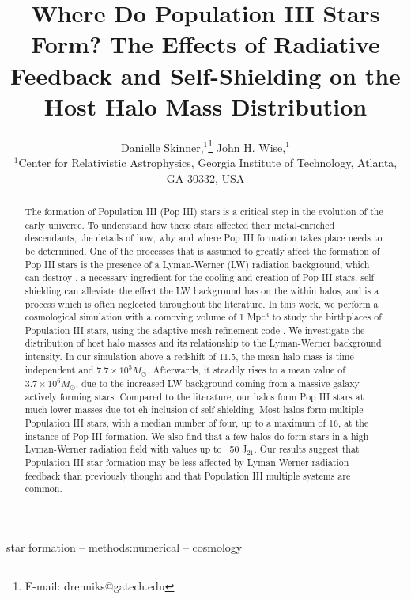 \documentclass[a4paper,fleqn,usenatbib]{mnras}
\title[Where Do Pop III Stars Form?]{Where Do Population III Stars Form? The Effects of Radiative Feedback and Self-Shielding on the Host Halo Mass Distribution}
\author[Danielle Skinner et al.]{
Danielle Skinner,$^{1}$\thanks{E-mail: drenniks@gatech.edu}
John H. Wise,$^{1}$
\\
$^{1}$Center for Relativistic Astrophysics, Georgia Institute of Technology, 
Atlanta, GA 30332, USA\\
}
\begin{document}
\label{firstpage}
\pagerange{\pageref{firstpage}--\pageref{lastpage}}
\maketitle

\begin{abstract}
The formation of Population III (Pop III) stars is a critical step in the evolution of the early universe. To understand how these stars affected their metal-enriched descendants, the details of how, why and where Pop III formation takes place needs to be determined. One of the processes that is assumed to greatly affect the formation of Pop III stars is the presence of a Lyman-Werner (LW) radiation background, which can destroy \hh{}, a necessary ingredient for the cooling and creation of Pop III stars. \hh{} self-shielding can alleviate the effect the LW background has on the \hh{} within halos, and is a process which is often neglected throughout the literature. In this work, we perform a cosmological simulation with a comoving volume of 1 Mpc$^{3}$ to study the birthplaces of Population III stars, using the adaptive mesh refinement code \enzo{}. We investigate the distribution of host halo masses and its relationship to the Lyman-Werner background intensity. In our simulation above a redshift of 11.5, the mean halo mass is time-independent and $7.7 \times 10^{5} M_{\odot}$. Afterwards, it steadily rises to a mean value of $3.7 \times 10^{6} M_{\odot}$, due to the increased LW background coming from a massive galaxy actively forming stars. Compared to the literature, our halos form Pop III stars at much lower masses due tot eh inclusion of \hh{} self-shielding. Most halos form multiple Population III stars, with a median number of four, up to a maximum of 16, at the instance of Pop III formation. We also find that a few halos do form stars in a high Lyman-Werner radiation field with values up to ~50 J$_{21}$. Our results suggest that Population III star formation may be less affected by Lyman-Werner radiation feedback than previously thought and that Population III multiple systems are common. 
\end{abstract}{}

\begin{keywords}
star formation -- methods:numerical -- cosmology
\end{keywords}

\end{document}
